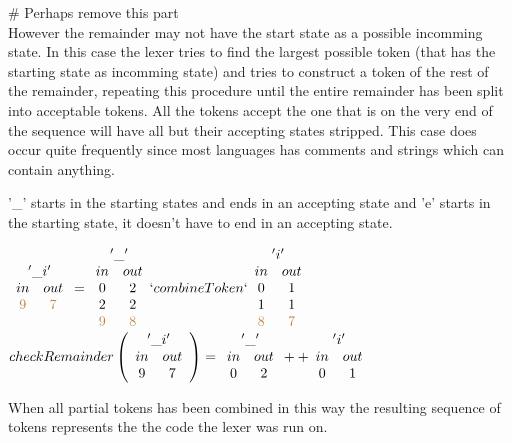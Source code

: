 \# Perhaps remove this part\\
However the remainder may not have the start state as a possible incomming state.
In this case the lexer tries to find the largest possible token (that has the
starting state as incomming state) and tries to construct a token of the rest of
the remainder, repeating this procedure until the entire remainder has been
split into acceptable tokens. All the tokens accept the one that is on the very
end of the sequence will have all but their accepting states stripped. This case
does occur quite frequently since most languages has comments and strings which
can contain anything.
\begin{example}\label{remToken}
'\_' starts in the starting states and ends in an accepting state and 'e' starts
in the starting state, it doesn't have to end in an accepting state.
\begin{center}
$\begin{array}{cc}\multicolumn{2}{c}{'\_i'}\\
in & out\\
\textcolor{brown}{9} & \textcolor{brown}{7}\\
\end{array}
=
\begin{array}{cc}\multicolumn{2}{c}{'\_'}\\
in & out\\
0 & 2\\
2 & 2\\
\textcolor{brown}{9} & \textcolor{brown}{8}\\
\end{array}
`combineToken`
\begin{array}{cc}
\multicolumn{2}{c}{'i'}\\
in & out\\
0 & 1\\
1 & 1\\
\textcolor{brown}{8} & \textcolor{brown}{7}\\
\end{array}$\\
$checkRemainder \left(\begin{array}{cc}\multicolumn{2}{c}{'\_i'}\\
in & out\\
9 & 7\\
\end{array} \right)
=
\begin{array}{cc}\multicolumn{2}{c}{'\_'}\\
in & out\\
0 & 2\\
\end{array} ++
\begin{array}{cc}\multicolumn{2}{c}{'i'}\\
in & out\\
0 & 1\\
\end{array}$\\
\end{center}
\end{example}
When all partial tokens has been combined in this way the resulting sequence of
tokens represents the the code the lexer was run on.

